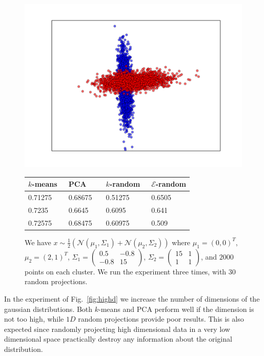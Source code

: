 \documentclass[aps,preprint,nofootinbib,floatfix]{revtex4-1}
\begin{document}
\begin{figure}
\begin{minipage}{.49\textwidth}
\includegraphics[scale=.45]{2d_weird1.pdf}
\end{minipage}
\begin{minipage}{.49\textwidth}
\begin{tabular}{ l l l l}
\hline
$k$-means~ & PCA~~~ & $k$-random~ & $\mathcal{E}$-random \\
\hline
0.71275 &
0.68675 &
0.51275 &
0.6505 \\
0.7235 & 
0.6645 & 
0.6095 & 
0.641 \\
0.72575 &
0.68475 &
0.60975 &
0.509 \\
\hline
\end{tabular}
\end{minipage}
\caption{\label{fig:weird1}
We have $x \sim \tfrac{1}{2}\left( \mathcal{N}(\mu_1, \Sigma_1) +
\mathcal{N}(\mu_2, \Sigma_2)\right)$ where $\mu_1 = (0,0)^T$, $\mu_2=(2,1)^T$,
$\Sigma_1 = \left( \begin{smallmatrix} 0.5 & -0.8 \\ -0.8 & 15 
\end{smallmatrix}
\right)$,
$\Sigma_2 = \left( \begin{smallmatrix} 15 & 1 \\ 1 & 1 \end{smallmatrix}
\right)$,
and $2000$ points on each cluster. We run the experiment three times,
with 30 random projections.
}
\end{figure}


In the experiment of Fig.~\ref{fig:highd} we increase the number of
dimensions of the gaussian distributions. Both $k$-means and PCA perform well
if the dimension is not too high, while $1D$ random projections provide
poor results. This is also expected since randomly projecting high dimensional
data in a very low dimensional space practically destroy any information
about the original distribution.
\end{document}
